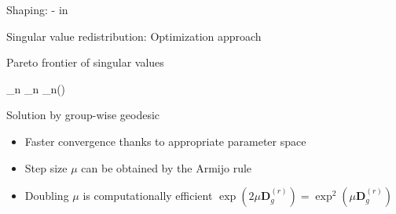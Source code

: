 \documentclass[presentation,xcolor={table},9pt]{beamer}
\begin{document}
\begin{section}{Shaping: - in }
	\begin{frame}{Singular value redistribution: Optimization approach}
		\begin{block}{Pareto frontier of singular values}
			\begin{maxi*}
				{\scriptstyle{\mathbf{\Theta}}}{\sum_n \rho_n \sigma_n()}{}{}
			\end{maxi*}
		\end{block}
		\begin{exampleblock}{Solution by group-wise geodesic }
			\begin{itemize}
				\item Faster convergence thanks to appropriate parameter space
				\item Step size $\mu$ can be obtained by the Armijo rule
				\item Doubling $\mu$ is computationally efficient $\exp(2 \mu \mathbf{D}_g^{(r)}) = \exp^2(\mu \mathbf{D}_g^{(r)})$
			\end{itemize}
		\end{exampleblock}
	\end{frame}


\end{section}
\end{document}
